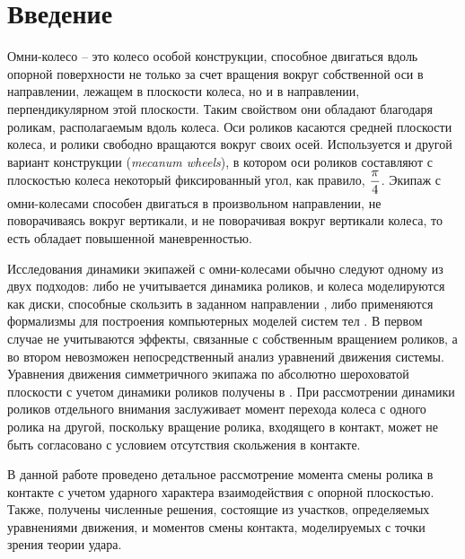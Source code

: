 
\section{Введение}

Омни-колесо -- это колесо особой конструкции, способное двигаться вдоль опорной поверхности не только за счет вращения вокруг собственной оси в направлении, лежащем в плоскости колеса, но и в направлении, перпендикулярном этой плоскости. Таким свойством они обладают благодаря роликам, располагаемым вдоль колеса. Оси роликов касаются средней плоскости колеса, и ролики свободно вращаются вокруг своих осей. Используется и другой вариант конструкции (\textit{mecanum wheels}), в котором оси роликов составляют с плоскостью колеса некоторый фиксированный угол, как правило, $\displaystyle\frac{\displaystyle \pi}{\displaystyle 4}$. Экипаж с омни-колесами способен двигаться в произвольном направлении, не поворачиваясь вокруг вертикали, и не поворачивая вокруг вертикали колеса, то есть обладает повышенной маневренностью.

Исследования динамики экипажей с омни-колесами обычно следуют одному из двух подходов: либо не учитывается динамика роликов, и колеса моделируются как диски, способные скользить в заданном направлении \cite{Bezinercionnaya}, либо применяются формализмы для построения компьютерных моделей систем тел \cite{Compjuternaya}. В первом случае не учитываются эффекты, связанные с собственным вращением роликов, а во втором невозможен непосредственный анализ уравнений движения системы. Уравнения движения симметричного экипажа по абсолютно шероховатой плоскости с учетом динамики роликов получены в \cite{ZobovaGerasimovPMM}. При рассмотрении динамики роликов отдельного внимания заслуживает момент перехода колеса с одного ролика на другой, поскольку вращение ролика, входящего в контакт, может не быть согласовано с условием отсутствия скольжения в контакте.

В данной работе проведено детальное рассмотрение момента смены ролика в контакте с учетом ударного характера взаимодействия с опорной плоскостью. Также, получены численные решения, состоящие из участков, определяемых уравнениями движения, и моментов смены контакта, моделируемых с точки зрения теории удара.